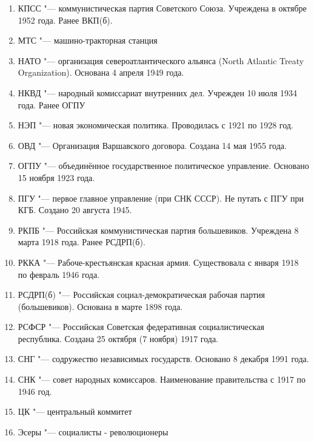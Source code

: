 \begin{enumerate}
    \item КПСС "--- коммунистическая партия Советского Союза. Учреждена в октябре 1952 года. Ранее ВКП(б).
    \item МТС "--- машино-тракторная станция \\
    \item НАТО "--- организация североатлантического альянса (North Atlantic Treaty Organization). Основана 4 апреля 1949 года. \\
    \item НКВД "--- народный комиссариат внутренних дел. Учрежден 10 июля 1934 года. Ранее ОГПУ \\
    \item НЭП "--- новая экономическая политика. Проводилась с 1921 по 1928 год. \\
    \item ОВД "--- Организация Варшавского договора. Создана 14 мая 1955 года. \\
    \item ОГПУ "--- объединённое государственное политическое управление. Основано 15 ноября 1923 года. \\
    \item ПГУ "--- первое главное управление (при СНК СССР). Не путать с ПГУ при КГБ. Создано 20 августа 1945. \\
    \item РКПБ "--- Российская коммунистическая партия большевиков. Учреждена 8 марта 1918 года. Ранее РСДРП(б). \\
    \item РККА "--- Рабоче-крестьянская красная армия. Существовала с января 1918 по февраль 1946 года. \\
    \item РСДРП(б) "--- Российская социал-демократическая рабочая партия (большевиков). Основана в марте 1898 года. \\
    \item РСФСР "--- Российская Советская федеративная социалистическая республика. Создана 25 октября (7 ноября) 1917 года. \\
    \item СНГ "--- содружество независимых государств. Основано 8 декабря 1991 года. \\
    \item СНК "--- совет народных комиссаров. Наименование правительства с 1917 по 1946 год. \\
    \item ЦК "--- центральный коммитет \\
    \item Эсеры "--- социалисты - революционеры \\
\end{enumerate}